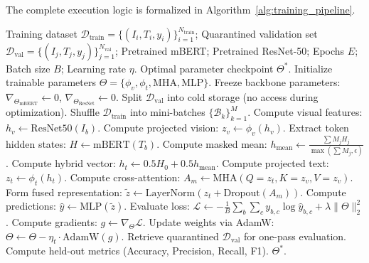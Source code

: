 \documentclass[10pt,journal,compsoc]{IEEEtran}
\begin{document}
The complete execution logic is formalized in Algorithm~\ref{alg:training_pipeline}.

\begin{algorithm}[!h]
\caption{End-to-End Training and Quarantined Validation of IndicSent-M}
\label{alg:training_pipeline}
\begin{algorithmic}[1]
\REQUIRE Training dataset $\mathcal{D}_{\text{train}} = \{(I_i, T_i, y_i)\}_{i=1}^{N_{\text{train}}}$; Quarantined validation set $\mathcal{D}_{\text{val}} = \{(I_j, T_j, y_j)\}_{j=1}^{N_{\text{val}}}$; Pretrained mBERT; Pretrained ResNet-50; Epochs $E$; Batch size $B$; Learning rate $\eta$.
\ENSURE Optimal parameter checkpoint $\Theta^*$.
\STATE Initialize trainable parameters $\Theta = \{\phi_v, \phi_t, \text{MHA}, \text{MLP}\}$.
\STATE Freeze backbone parameters: $\nabla_{\Theta_{\text{mBERT}}} \gets 0$, $\nabla_{\Theta_{\text{ResNet}}} \gets 0$.
\STATE Split $\mathcal{D}_{\text{val}}$ into cold storage (no access during optimization).
    \STATE Shuffle $\mathcal{D}_{\text{train}}$ into mini-batches $\{\mathcal{B}_k\}_{k=1}^{M}$.
        \STATE Compute visual features: $h_v \gets \text{ResNet50}(I_b)$.
        \STATE Compute projected vision: $z_v \gets \phi_v(h_v)$.
        \STATE Extract token hidden states: $H \gets \text{mBERT}(T_b)$.
        \STATE Compute masked mean: $h_{\text{mean}} \gets \frac{\sum M_j H_j}{\max(\sum M_j, \epsilon)}$.
        \STATE Compute hybrid vector: $h_t \gets 0.5 H_0 + 0.5 h_{\text{mean}}$.
        \STATE Compute projected text: $z_t \gets \phi_t(h_t)$.
        \STATE Compute cross-attention: $A_m \gets \text{MHA}(Q=z_t, K=z_v, V=z_v)$.
        \STATE Form fused representation: $\tilde{z} \gets \text{LayerNorm}(z_t + \text{Dropout}(A_m))$.
        \STATE Compute predictions: $\hat{y} \gets \text{MLP}(\tilde{z})$.
        \STATE Evaluate loss: $\mathcal{L} \gets -\frac{1}{B}\sum_b \sum_c y_{b,c} \log \hat{y}_{b,c} + \lambda \|\Theta\|_2^2$.
        \STATE Compute gradients: $g \gets \nabla_\Theta \mathcal{L}$.
        \STATE Update weights via AdamW: $\Theta \gets \Theta - \eta_t \cdot \text{AdamW}(g)$.
    \ENDFOR
\ENDFOR
\STATE Retrieve quarantined $\mathcal{D}_{\text{val}}$ for one-pass evaluation.
\STATE Compute held-out metrics (Accuracy, Precision, Recall, F1).
\RETURN $\Theta^*$.
\end{algorithmic}
\end{algorithm}
\end{document}

